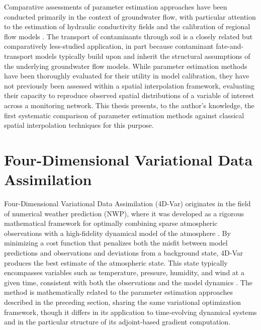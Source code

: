 Comparative assessments of parameter estimation approaches have been conducted primarily in the context of groundwater flow, with particular attention to the estimation of hydraulic conductivity fields and the calibration of regional flow models \cite{parEst_comp_groundwaterFlow, parEst_comp_hydraulicConductivity}. The transport of contaminants through soil is a closely related but comparatively less-studied application, in part because contaminant fate-and-transport models typically build upon and inherit the structural assumptions of the underlying groundwater flow models. While parameter estimation methods have been thoroughly evaluated for their utility in model calibration, they have not previously been assessed within a spatial interpolation framework, evaluating their capacity to reproduce observed spatial distributions of a variable of interest across a monitoring network. This thesis presents, to the author's knowledge, the first systematic comparison of parameter estimation methods against classical spatial interpolation techniques for this purpose.

\section{Four-Dimensional Variational Data Assimilation}
\label{sec:fdvar_da}

Four-Dimensional Variational Data Assimilation (4D-Var) originates in the field of numerical weather prediction (NWP), where it was developed as a rigorous mathematical framework for optimally combining sparse atmospheric observations with a high-fidelity dynamical model of the atmosphere \cite{da_history}. By minimizing a cost function that penalizes both the misfit between model predictions and observations and deviations from a background state, 4D-Var produces the best estimate of the atmospheric state. This state typically encompasses variables such as temperature, pressure, humidity, and wind at a given time, consistent with both the observations and the model dynamics \cite{da_history, da_overview}. The method is mathematically related to the parameter estimation approaches described in the preceding section, sharing the same variational optimization framework, though it differs in its application to time-evolving dynamical systems and in the particular structure of its adjoint-based gradient computation.

